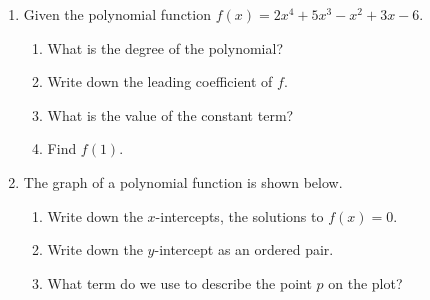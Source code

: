 \documentclass[12pt, twoside]{article}
\begin{document}
\begin{enumerate}
\newpage
\item Given the polynomial function $f(x)=2x^4+5x^3-x^2+3x-6$. 
    \begin{enumerate}[itemsep=0.7cm]
        \item What is the degree of the polynomial?
        \item Write down the leading coefficient of $f$.
        \item What is the value of the constant term?
        \item Find $f(1)$.
    \end{enumerate} \vspace{0.7cm}

\item The graph of a polynomial function is shown below. 
    \begin{enumerate}[itemsep=0.7cm]
        \item Write down the $x$-intercepts, the solutions to $f(x)=0$.
        \item Write down the $y$-intercept as an ordered pair.
        \item What term do we use to describe the point $p$ on the plot?
    \end{enumerate} \vspace{0.7cm}
    \begin{center}
    \end{center}

\end{enumerate}
\end{document}

